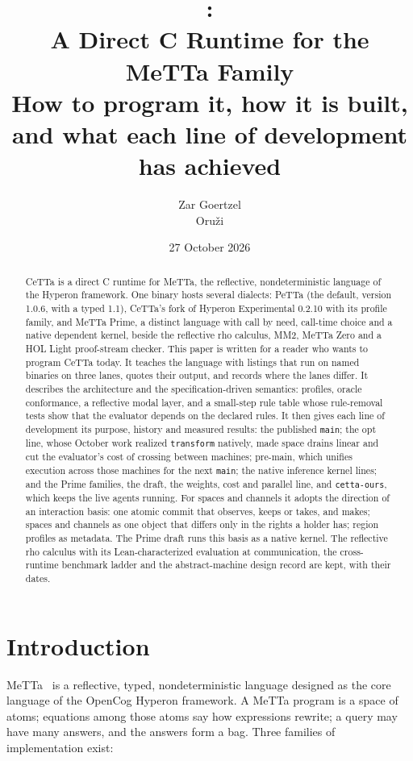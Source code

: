 \documentclass[11pt]{article}
\title{\CeTTa{}:\\
\large A Direct C Runtime for the MeTTa Family\\[2pt]
\normalsize How to program it, how it is built, and what each line of
development has achieved}
\author{Zar Goertzel\\Oru\v{z}i}
\date{27 October 2026}
\newcommand{\code}[1]{\texttt{#1}}
\newcommand{\PeTTa}{\textup{PeTTa}}
\newcommand{\CeTTa}{\textup{CeTTa}}
\begin{document}
\maketitle

\begin{abstract}
\CeTTa{} is a direct C runtime for MeTTa, the reflective, nondeterministic
language of the Hyperon framework.  One binary hosts several dialects: \PeTTa{}
(the default, version 1.0.6, with a typed 1.1), \CeTTa{}'s fork of Hyperon
Experimental 0.2.10 with its profile family, and MeTTa Prime, a distinct
language with call by need, call-time choice and a native dependent kernel,
beside the reflective rho calculus, MM2, MeTTa Zero and a HOL Light
proof-stream checker.  This paper is written for a reader who wants to program
\CeTTa{} today.  It teaches the language with listings that run on named
binaries on three lanes, quotes their output, and records where the lanes
differ.  It describes the architecture and the specification-driven
semantics: profiles, oracle conformance, a reflective modal layer, and a
small-step rule table whose rule-removal tests show that the evaluator depends
on the declared rules.  It then gives each line of development its purpose,
history and measured results: the published \code{main}; the opt line, whose
October work realized \code{transform} natively, made space drains linear and
cut the evaluator's cost of crossing between machines; pre-main, which unifies
execution across those machines for the next \code{main}; the native
inference kernel lines; and the Prime families, the draft, the weights, cost
and parallel line, and \code{cetta-ours}, which keeps the live agents running.
For spaces and channels it adopts the direction of an interaction basis: one
atomic commit that observes, keeps or takes, and makes; spaces and channels as
one object that differs only in the rights a holder has; region profiles as
metadata.  The Prime draft runs this basis as a native kernel.  The
reflective rho calculus with its Lean-characterized evaluation at
communication, the cross-runtime benchmark ladder and the abstract-machine
design record are kept, with their dates.
\end{abstract}

\section{Introduction}
\label{sec:intro}

MeTTa~\cite{metta} is a reflective, typed, nondeterministic language
designed as the core language of the OpenCog Hyperon framework.  A MeTTa
program is a space of atoms; equations among those atoms say how expressions
rewrite; a query may have many answers, and the answers form a bag.  Three
families of implementation exist:
\end{document}
